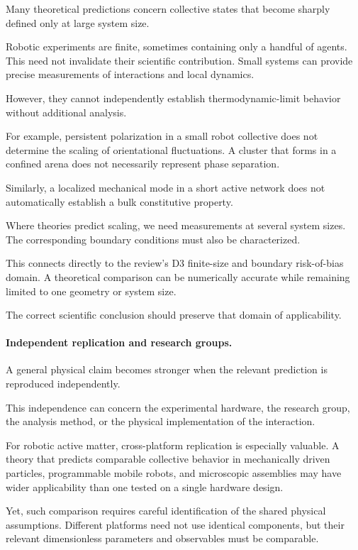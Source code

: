 Many theoretical
predictions concern
collective states
that become sharply
defined only
at large system
size.

Robotic experiments
are finite,
sometimes containing
only a handful
of agents.
This need not
invalidate their
scientific contribution.
Small systems
can provide
precise measurements
of interactions
and local dynamics.

However,
they cannot
independently
establish
thermodynamic-limit
behavior without
additional analysis.

For example,
persistent polarization
in a small robot
collective does
not determine
the scaling
of orientational
fluctuations.
A cluster that
forms in a
confined arena
does not
necessarily
represent
phase separation.

Similarly,
a localized
mechanical mode
in a short
active network
does not
automatically
establish a
bulk constitutive
property.

Where theories
predict scaling,
we need
measurements
at several
system sizes.
The corresponding
boundary conditions
must also be
characterized.

This connects
directly to
the review's
D3 finite-size
and boundary
risk-of-bias
domain.
A theoretical
comparison can
be numerically
accurate while
remaining limited
to one geometry
or system size.

The correct
scientific conclusion
should preserve
that domain
of applicability.

\paragraph*{Independent replication and research groups.}

A general physical
claim becomes
stronger when
the relevant
prediction is
reproduced independently.

This independence
can concern
the experimental
hardware,
the research group,
the analysis
method, or
the physical
implementation
of the interaction.

For robotic
active matter,
cross-platform
replication is
especially valuable.
A theory that
predicts comparable
collective behavior
in mechanically
driven particles,
programmable
mobile robots,
and microscopic
assemblies may
have wider
applicability
than one tested
on a single
hardware design.

Yet, such
comparison requires
careful identification
of the shared
physical assumptions.
Different platforms
need not use
identical components,
but their relevant
dimensionless
parameters and
observables
must be comparable.

